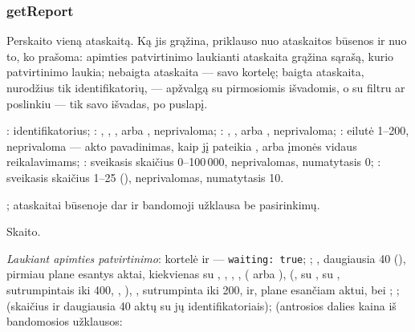 \subsubsection{getReport}\label{sec:tools:getReport}
\begin{description}[style=multiline, leftmargin=19mm, labelwidth=17mm, labelsep=2mm,
  font=\sffamily\bfseries\footnotesize\color{ink}, itemsep=1pt, topsep=2pt, before=\raggedright]
  \item[Paskirtis] Perskaito vieną ataskaitą. Ką jis grąžina, priklauso nuo ataskaitos būsenos
    ir nuo to, ko prašoma: apimties patvirtinimo laukianti ataskaita grąžina sąrašą, kurio
    patvirtinimo laukia; nebaigta ataskaita --- savo kortelę; baigta ataskaita, nurodžius tik
    identifikatorių, --- apžvalgą su pirmosiomis išvadomis, o su filtru ar poslinkiu --- tik
    savo išvadas, po puslapį.
  \item[Įvestis] : identifikatorius; : , ,
    ,  arba , neprivaloma; :
    , ,  arba , neprivaloma; :
    eilutė 1--200, neprivaloma --- akto pavadinimas, kaip jį pateikia , arba
     įmonės vidaus reikalavimams; : sveikasis skaičius
    0--100\,000, neprivalomas, numatytasis 0; : sveikasis skaičius 1--25
    (), neprivalomas, numatytasis 10.
  \item[Užklausos] ; ataskaitai būsenoje  dar
    ir bandomoji užklausa  be pasirinkimų.
  \item[Pobūdis] Skaito.
  \item[Grąžina] \emph{Laukiant apimties patvirtinimo}: kortelė ir  ---
    \texttt{waiting: true}; ; , daugiausia 40
    (), pirmiau plane esantys aktai, kiekvienas su , ,
    , ,  ( arba ), 
    (,  su ,  su
    , sutrumpintais iki 400, , ),
    , sutrumpinta iki 200, ir, plane esančiam aktui,  bei
    ; ;  (skaičius ir daugiausia 40 aktų su jų
    identifikatoriais);  (antrosios dalies kaina iš bandomosios užklausos:

\end{description}
